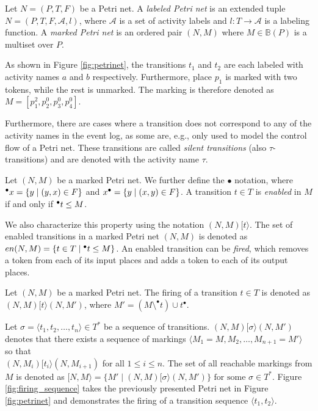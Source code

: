\begin{definition}
    Let $N = (P, T, F)$ be a Petri net. A \emph{labeled Petri net} is an extended tuple $N = (P, T, F, \mathcal{A}, l)$, where $\mathcal{A}$ is a set of activity labels and $l: T \rightarrow \mathcal{A}$ is a labeling function. A \emph{marked Petri net} is an ordered pair $(N, M)$ where $M \in \mathbb{B}(P)$ is a multiset over $P$.
\end{definition}

As shown in Figure \ref{fig:petrinet}, the transitions $t_1$ and $t_2$ are each labeled with activity names $a$ and $b$ respectively. Furthermore, place $p_1$ is marked with two tokens, while the rest is unmarked. The marking is therefore denoted as $M = [p_1^2, p_2^0, p_3^0, p_4^0]$.

Furthermore, there are cases where a transition does not correspond to any of the activity names in the event log, as some are, e.g., only used to model the control flow of a Petri net. These transitions are called \emph{silent transitions} (also $\tau$-transitions) and are denoted with the activity name $\tau$.

\begin{definition}
    Let $(N, M)$ be a marked Petri net.  We further define the $\bullet$ notation, where ${^{\bullet}x} = \{ y \mid (y, x) \in F \}$ and $x^{\bullet}= \{ y \mid (x, y) \in F \}$. A transition $t \in T$ is \emph{enabled} in $M$ if and only if ${^{\bullet}t} \leq M$.
\end{definition}

We also characterize this property using the notation $(N, M)[t\rangle$. The set of enabled transitions in a marked Petri net $(N, M)$ is denoted as $en(N, M) = \{ t \in T \mid {^{\bullet}t} \leq M \}$. An enabled transition can be \emph{fired}, which removes a token from each of its input places and adds a token to each of its output places.

\begin{definition}
    Let $(N, M)$ be a marked Petri net. The firing of a transition $t \in T$ is denoted as $(N, M) [t\rangle (N, M')$, where $M' = (M \setminus ^{\bullet}t) \cup t^{\bullet}$.
\end{definition}

Let $\sigma = \langle t_1, t_2, \dots, t_n \rangle \in T^*$ be a sequence of transitions. $(N, M)[\sigma \rangle (N, M')$ denotes that there exists a sequence of markings $\langle M_1 = M, M_2, \dots, M_{n+1} = M' \rangle$ so that \\ $(N, M_i)[t_i \rangle (N, M_{i+1})$ for all $1 \leq i \leq n$. The set of all reachable markings from $M$ is denoted as $[N, M\rangle = \{ M' \mid (N, M) [\sigma\rangle (N, M') \} \text{ for some } \sigma \in T^*$. Figure \ref{fig:firing_sequence} takes the previously presented Petri net in Figure \ref{fig:petrinet} and demonstrates the firing of a transition sequence $\langle t_1, t_2 \rangle$.

